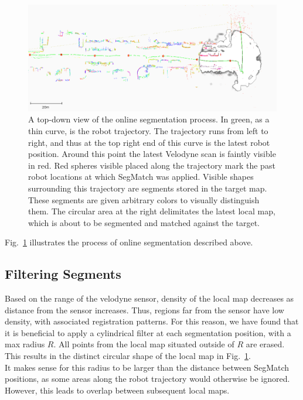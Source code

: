 \begin{figure}
  \centering
  \includegraphics[width=5.2in]{images/seg_queue.png}
  \caption{A top-down view of the online segmentation process. In green, as a thin curve, is the robot trajectory. The trajectory runs from left to right, and thus at the top right end of this curve is the latest robot position. Around this point the latest Velodyne scan is faintly visible in red. Red spheres visible placed along the trajectory mark the past robot locations at which SegMatch was applied. Visible shapes surrounding this trajectory are segments stored in the target map. These segments are given arbitrary colors to visually distinguish them. The circular area at the right delimitates the latest local map, which is about to be segmented and matched against the target.}
  \label{fig:seg-queue}
\end{figure}

Fig.~\ref{fig:seg-queue} illustrates the process of online segmentation described above.


\subsection{Filtering Segments}
\label{subsec:filtering-segments}

Based on the range of the velodyne sensor, density of the local map decreases as distance from the sensor increases. Thus, regions far from the sensor have low density, with associated registration patterns. For this reason, we have found that it is beneficial to apply a cylindrical filter at each segmentation position, with a max radius $R$. All points from the local map situated outside of $R$ are erased. This results in the distinct circular shape of the local map in Fig.~\ref{fig:seg-queue}.\\

It makes sense for this radius to be larger than the distance between SegMatch positions, as some areas along the robot trajectory would otherwise be ignored. However, this leads to overlap between subsequent local maps.

